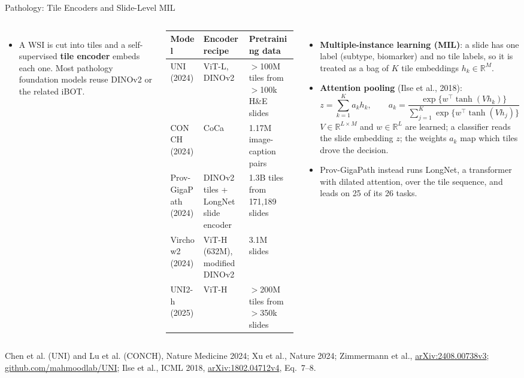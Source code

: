 \begin{frame}{Pathology: Tile Encoders and Slide-Level MIL}
  \begin{columns}[T,onlytextwidth]
      \begin{itemize}\scriptsize\itemsep0.25em
        \item A WSI is cut into tiles and a self-supervised \textbf{tile encoder} embeds each one. Most pathology foundation models reuse DINOv2 or the related iBOT.
      \end{itemize}
      {\centering\scriptsize
      \begin{tabular}{@{}>{\raggedright\arraybackslash}p{1.5cm} >{\raggedright\arraybackslash}p{1.95cm} >{\raggedright\arraybackslash}p{2.6cm}@{}}
        \toprule
        \textbf{Model} & \textbf{Encoder recipe} & \textbf{Pretraining data} \\
        \midrule
        UNI (2024) & ViT-L, DINOv2 & $>$100M tiles from $>$100k H\&E slides \\
        CONCH (2024) & CoCa & 1.17M image-caption pairs \\
        Prov-GigaPath (2024) & DINOv2 tiles + LongNet slide encoder & 1.3B tiles from 171,189 slides \\
        Virchow2 (2024) & ViT-H (632M), modified DINOv2 & 3.1M slides \\
        UNI2-h (2025) & ViT-H & $>$200M tiles from $>$350k slides \\
        \bottomrule
      \end{tabular}\par}
      \begin{itemize}\scriptsize\itemsep0.3em
        \item \textbf{Multiple-instance learning (MIL)}: a slide has one label (subtype, biomarker) and no tile labels, so it is treated as a bag of $K$ tile embeddings $h_k \in \mathbb{R}^{M}$.
        \item \textbf{Attention pooling} (Ilse et al., 2018):
        \[ z = \sum_{k=1}^{K} a_k h_k, \qquad a_k = \frac{\exp\{w^\top \tanh(V h_k)\}}{\sum_{j=1}^{K}\exp\{w^\top \tanh(V h_j)\}} \]
        $V \in \mathbb{R}^{L\times M}$ and $w \in \mathbb{R}^{L}$ are learned; a classifier reads the slide embedding $z$; the weights $a_k$ map which tiles drove the decision.
        \item Prov-GigaPath instead runs LongNet, a transformer with dilated attention, over the tile sequence, and leads on 25 of its 26 tasks.
      \end{itemize}
  \end{columns}
  {\scriptsize Chen et al. (UNI) and Lu et al. (CONCH), Nature Medicine 2024; Xu et al., Nature 2024; Zimmermann et al., \href{https://arxiv.org/abs/2408.00738v3}{arXiv:2408.00738v3}; \href{https://github.com/mahmoodlab/UNI}{github.com/mahmoodlab/UNI}; Ilse et al., ICML 2018, \href{https://arxiv.org/abs/1802.04712v4}{arXiv:1802.04712v4}, Eq.~7--8.\par}
\end{frame}

